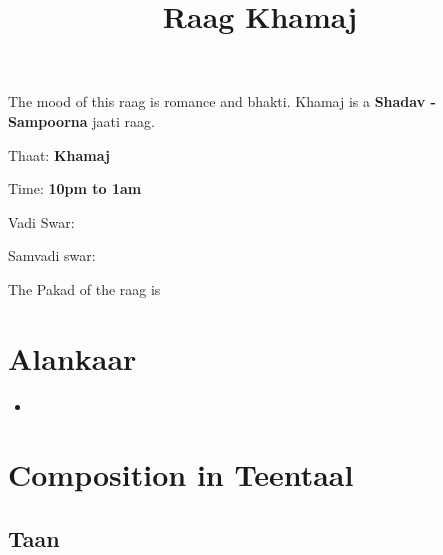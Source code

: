 \documentclass{hindustani}
\begin{document}
\title{Raag Khamaj}
\author{}
\date{}
\maketitle


The mood of this raag is romance and bhakti. Khamaj is a \textbf{Shadav - Sampoorna} jaati raag.



Thaat: \textbf{Khamaj}

Time: \textbf{10pm to 1am}

Vadi Swar: \textbf{\Ga}  

Samvadi swar: \textbf{\Nii}

The Pakad of the raag is \textbf{}  \textbf{}


\section{Alankaar}
\begin{itemize}

\item {}



\end{itemize}


\section{Composition in Teentaal}
\begin{flushleft}



\end{flushleft}

\subsection{Taan}
\begin{flushleft}


\end{flushleft}
\end{document}
